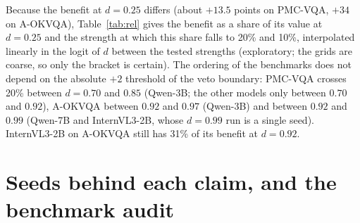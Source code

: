Because the benefit at $d=0.25$ differs (about $+13.5$ points on PMC-VQA, $+34$ on A-OKVQA), Table~\ref{tab:rel} gives the benefit as a share of its value at $d=0.25$ and the strength at which this share falls to 20\% and 10\%, interpolated linearly in the logit of $d$ between the tested strengths (exploratory; the grids are coarse, so only the bracket is certain).
The ordering of the benchmarks does not depend on the absolute $+2$ threshold of the veto boundary: PMC-VQA crosses 20\% between $d=0.70$ and $0.85$ (Qwen-3B; the other models only between $0.70$ and $0.92$), A-OKVQA between $0.92$ and $0.97$ (Qwen-3B) and between $0.92$ and $0.99$ (Qwen-7B and InternVL3-2B, whose $d=0.99$ run is a single seed).
InternVL3-2B on A-OKVQA still has 31\% of its benefit at $d=0.92$.

\begin{table}[tbp]
  \centering
  \footnotesize
  \setlength{\tabcolsep}{2.4pt}
  \sloppy \caption{\textbf{Benefit relative to the benefit without a cue.} $g$(0.25): mean image benefit (points) at $d=0.25$; $d$ at 20\% and 10\%: interpolated strength at which the benefit falls to that share of $g$(0.25) (--: not reached within the tested strengths); share at 0.92: benefit at $d=0.92$ as a share of $g$(0.25).}
  \label{tab:rel}
\end{table}

\section{Seeds behind each claim, and the benchmark audit}
\label{app:seeds}

